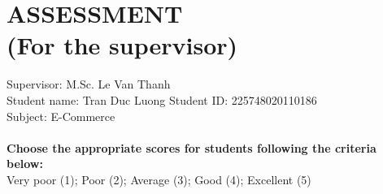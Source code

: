 \section*{ASSESSMENT\\\fontsize{14pt}{0pt}\selectfont \vspace{4pt}\textnormal{(For the supervisor)}}
\thispagestyle{empty}
\vspace{-16pt}
\hspace{-1cm}Supervisor: M.Sc. Le Van Thanh\\
Student name: Tran Duc Luong Student ID: 225748020110186\\
Subject: E-Commerce\\
\\
\textbf{Choose the appropriate scores for students following the criteria below:}\\
Very poor (1); Poor (2); Average (3); Good (4); Excellent (5) 

